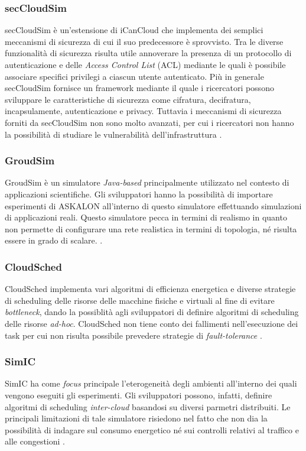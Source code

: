 {\subsubsection*{secCloudSim}
secCloudSim \cite{rehman2014seccloudsim} è un'estensione di iCanCloud che implementa dei semplici meccanismi di sicurezza di cui il suo predecessore è sprovvisto. Tra le diverse funzionalità di sicurezza risulta utile annoverare la presenza di un protocollo di autenticazione e delle \emph{Access Control List} (ACL) mediante le quali è possibile associare specifici privilegi a ciascun utente autenticato. Più in generale secCloudSim fornisce un framework mediante il quale i ricercatori possono sviluppare le caratteristiche di sicurezza come cifratura, decifratura, incapsulamente, autenticazione e privacy. Tuttavia i meccanismi di sicurezza forniti da secCloudSim non sono molto avanzati, per cui i ricercatori non hanno la possibilità di studiare le vulnerabilità dell'infrastruttura \cite{mansouri2020cloud}. 
\subsubsection*{GroudSim}
GroudSim \cite{ostermann2011groudsim} è un simulatore \emph{Java-based} principalmente utilizzato nel contesto di applicazioni scientifiche. Gli sviluppatori hanno la possibilità di importare esperimenti di ASKALON \cite{fahringer2005askalon} all'interno di questo simulatore effettuando simulazioni di applicazioni reali. Questo simulatore pecca in termini di realismo in quanto non permette di configurare una rete realistica in termini di topologia, né risulta essere in grado di scalare. \cite{mansouri2020cloud}.
\subsubsection*{CloudSched}
CloudSched \cite{tian2013toolkit} implementa vari algoritmi di efficienza energetica e diverse strategie di scheduling delle risorse delle macchine fisiche e virtuali al fine di evitare \emph{bottleneck}, dando la possiblità agli sviluppatori di definire algoritmi di scheduling delle risorse \emph{ad-hoc}. CloudSched non tiene conto dei fallimenti nell'esecuzione dei task per cui non risulta possibile prevedere strategie di \emph{fault-tolerance} \cite{mansouri2020cloud}.
\subsubsection*{SimIC}
SimIC \cite{sotiriadis2013simic} ha come \emph{focus} principale l'eterogeneità degli ambienti all'interno dei quali vengono eseguiti gli esperimenti. Gli sviluppatori possono, infatti, definire algoritmi di scheduling \emph{inter-cloud} basandosi su diversi parmetri distribuiti. Le principali limitazioni di tale simulatore risiedono nel fatto che non dia la possibilità di indagare sul consumo energetico né sui controlli relativi al traffico e alle congestioni \cite{mansouri2020cloud}. 
}
